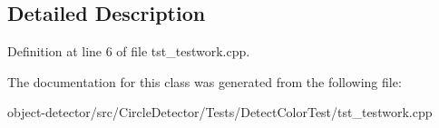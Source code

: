 \subsection{Detailed Description}


Definition at line 6 of file tst\+\_\+testwork.\+cpp.



The documentation for this class was generated from the following file\+:\begin{DoxyCompactItemize}
\item 
object-\/detector/src/\+Circle\+Detector/\+Tests/\+Detect\+Color\+Test/tst\+\_\+testwork.\+cpp\end{DoxyCompactItemize}
